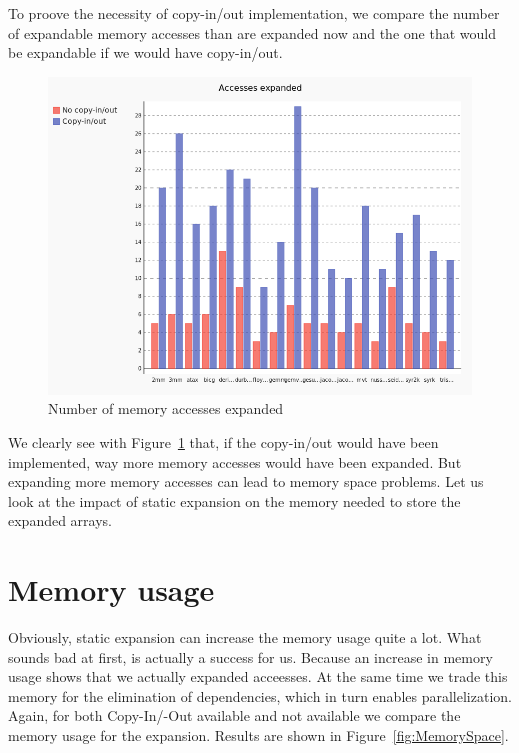To proove the necessity of copy-in/out implementation, we compare the number of expandable memory accesses than are expanded now and the one that would be expandable if we would have copy-in/out.

\begin{figure}
\centering
\includegraphics[scale=0.4]{gfx/Evaluation/Numbers.png}
\caption{Number of memory accesses expanded}
\label{fig:Numbers}
\end{figure}

We clearly see with Figure~\ref{fig:Numbers} that, if the copy-in/out would have been implemented, way more memory accesses would have been expanded. But expanding more memory accesses can lead to memory space problems. Let us look at the impact of static expansion on the memory needed to store the expanded arrays.

\section{Memory usage}
Obviously, static expansion can increase the memory usage quite a lot. What sounds bad at first, is actually a success for us. Because an increase in memory usage shows that we actually expanded acceesses. At the same time we trade this memory for the elimination of dependencies, which in turn enables parallelization. Again, for both Copy-In/-Out available and not available we compare the memory usage for the expansion. Results are shown in Figure~\ref{fig:MemorySpace}.

